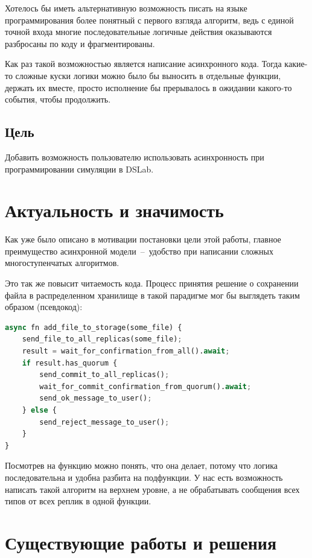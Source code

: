 Хотелось бы иметь альтернативную возможность писать на языке программирования более понятный с первого взгляда алгоритм, ведь с единой точной входа многие последовательные логичные действия оказываются разбросаны по коду и фрагментированы. 

Как раз такой возможностью является написание асинхронного кода. Тогда какие-то сложные куски логики можно было бы выносить в отдельные функции, держать их вместе, просто исполнение бы прерывалось в ожидании какого-то события, чтобы продолжить.

\subsection{Цель}

Добавить возможность пользователю использовать асинхронность при программировании симуляции в DSLab.

\newpage

\section{Актуальность и значимость}

Как уже было описано в мотивации постановки цели этой работы, главное преимущество асинхронной модели~--~удобство при написании сложных многоступенчатых алгоритмов.

Это так же повысит читаемость кода. Процесс принятия решение о сохранении файла в распределенном хранилище в такой парадигме мог бы выглядеть таким образом (псевдокод):

\begin{lstlisting}[language=Python]
async fn add_file_to_storage(some_file) {
    send_file_to_all_replicas(some_file);
    result = wait_for_confirmation_from_all().await;
    if result.has_quorum {
        send_commit_to_all_replicas();
        wait_for_commit_confirmation_from_quorum().await;
        send_ok_message_to_user();
    } else {
        send_reject_message_to_user();
    }
}
\end{lstlisting}

Посмотрев на функцию можно понять, что она делает, потому что логика последовательна и удобна разбита на подфункции. У нас есть возможность написать такой алгоритм на верхнем уровне, а не обрабатывать сообщения всех типов от всех реплик в одной функции.


\section{Существующие работы и решения}

